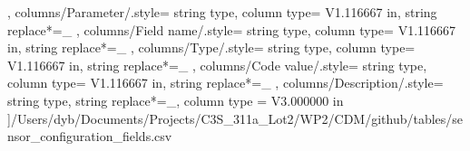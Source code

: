 \begin{landscape}
{        },
    columns/Parameter/.style={
            string type, 
            column type= V{1.116667 in}, 
            string replace*={_}{}
        },
    columns/Field name/.style={
            string type, 
            column type= V{1.116667 in}, 
            string replace*={_}{}
        },
    columns/Type/.style={
            string type, 
            column type= V{1.116667 in}, 
            string replace*={_}{}
        },
    columns/Code value/.style={
            string type, 
            column type= V{1.116667 in}, 
            string replace*={_}{}
        },
    columns/Description/.style={
            string type, 
            string replace*={_}{},
            column type = V{3.000000 in}
        }
    ]{/Users/dyb/Documents/Projects/C3S_311a_Lot2/WP2/CDM/github/tables/sensor_configuration_fields.csv}
\end{landscape}
